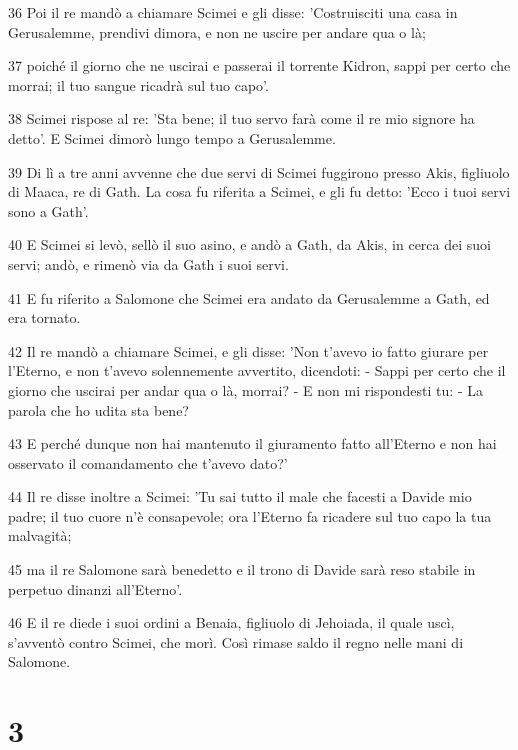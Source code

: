\par 36 Poi il re mandò a chiamare Scimei e gli disse: 'Costruisciti una casa in Gerusalemme, prendivi dimora, e non ne uscire per andare qua o là;
\par 37 poiché il giorno che ne uscirai e passerai il torrente Kidron, sappi per certo che morrai; il tuo sangue ricadrà sul tuo capo'.
\par 38 Scimei rispose al re: 'Sta bene; il tuo servo farà come il re mio signore ha detto'. E Scimei dimorò lungo tempo a Gerusalemme.
\par 39 Di lì a tre anni avvenne che due servi di Scimei fuggirono presso Akis, figliuolo di Maaca, re di Gath. La cosa fu riferita a Scimei, e gli fu detto: 'Ecco i tuoi servi sono a Gath'.
\par 40 E Scimei si levò, sellò il suo asino, e andò a Gath, da Akis, in cerca dei suoi servi; andò, e rimenò via da Gath i suoi servi.
\par 41 E fu riferito a Salomone che Scimei era andato da Gerusalemme a Gath, ed era tornato.
\par 42 Il re mandò a chiamare Scimei, e gli disse: 'Non t'avevo io fatto giurare per l'Eterno, e non t'avevo solennemente avvertito, dicendoti: - Sappi per certo che il giorno che uscirai per andar qua o là, morrai? - E non mi rispondesti tu: - La parola che ho udita sta bene?
\par 43 E perché dunque non hai mantenuto il giuramento fatto all'Eterno e non hai osservato il comandamento che t'avevo dato?'
\par 44 Il re disse inoltre a Scimei: 'Tu sai tutto il male che facesti a Davide mio padre; il tuo cuore n'è consapevole; ora l'Eterno fa ricadere sul tuo capo la tua malvagità;
\par 45 ma il re Salomone sarà benedetto e il trono di Davide sarà reso stabile in perpetuo dinanzi all'Eterno'.
\par 46 E il re diede i suoi ordini a Benaia, figliuolo di Jehoiada, il quale uscì, s'avventò contro Scimei, che morì. Così rimase saldo il regno nelle mani di Salomone.

\chapter{3}


